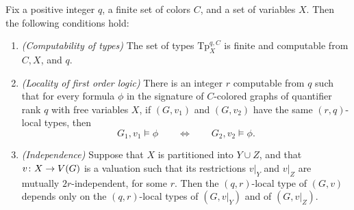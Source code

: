 \begin{proposition}\label{pro:gaifman}
	Fix a positive integer $q$, a finite set of colors $C$, and a set of variables $X$. Then the following conditions hold:
 \begin{enumerate}
 	\item \emph{(Computability of types)} The set of types $\mathrm{Tp}^{q,C}_X$ is finite and computable from $C, X$, and $q$.

	\item \emph{(Locality of first order logic)} There is an integer $r$ computable from $q$ such that for every formula $\phi$ in the signature of $C$-colored graphs  
	of quantifier rank $q$ with free variables $X$,	
  if $(G,v_1)$ and $(G,v_2)$ have the same $(r,q)$-local types,
	then
	 $$G_1,v_1\models \phi\qquad\iff \qquad G_2,v_2\models \phi.$$



	 \item \emph{(Independence)} Suppose that $X$ is partitioned into $Y\cup Z$, 
	 and that $v\colon X\to V(G)$ is a valuation
   such that its restrictions $v|_Y$ and $v|_Z$
   are mutually $2r$-independent, for some $r$.    
   Then the $(q,r)$-local type of $(G,v)$
   depends only on the $(q,r)$-local types of $(G,v|_Y)$
   and of $(G,v|_Z)$.
	 
 \end{enumerate}
\end{proposition}



